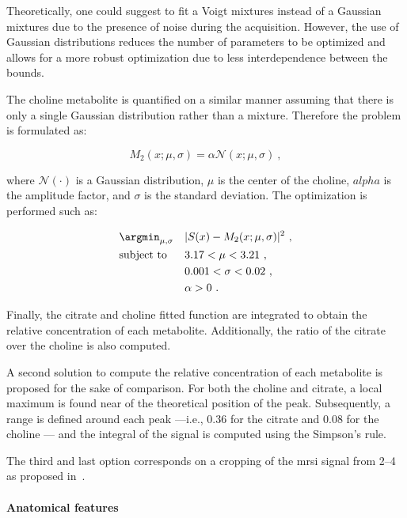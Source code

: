 Theoretically, one could suggest to fit a Voigt mixtures instead of a Gaussian mixtures due to the presence of noise during the acquisition.
However, the use of Gaussian distributions reduces the number of parameters to be optimized and allows for a more robust optimization due to less interdependence between the bounds.

The choline metabolite is quantified on a similar manner assuming that there is only a single Gaussian distribution rather than a mixture.
Therefore the problem is formulated as:

\begin{equation}
  M_2(x; \mu, \sigma) = \alpha \mathcal{N}(x; \mu, \sigma) \ ,
  \label{eq:costcho}
\end{equation}

\noindent where $\mathcal{N}(\cdot)$ is a Gaussian distribution, $\mu$ is the center of the choline, $alpha$ is the amplitude factor, and $\sigma$ is the standard deviation. The optimization is performed such as:

\begin{equation}
\begin{aligned}
& \argmin_{\mathbf{\mu, \sigma}} 
& & | S(x) - M_2(x; \mu, \sigma) |^{2} \ , \label{eq:mincostcho} \\
& \text{subject to}
& & 3.17 < \mu < 3.21 \ , \\
&&& 0.001 < \sigma < 0.02 \ , \\
&&& \alpha > 0 \ .
\end{aligned}
\end{equation}

Finally, the citrate and choline fitted function are integrated to obtain the relative concentration of each metabolite.
Additionally, the ratio of the citrate over the choline is also computed.

A second solution to compute the relative concentration of each metabolite is proposed for the sake of comparison.
For both the choline and citrate, a local maximum is found near of the theoretical position of the peak.
Subsequently, a range is defined around each peak ---i.e., \SI{0.36}{\ppm} for the citrate and \SI{0.08}{\ppm} for the choline --- and the integral of the signal is computed using the Simpson's rule.

The third and last option corresponds on a cropping of the \ac{mrsi} signal from \SIrange{2}{4}{\ppm} as proposed in~\cite{Parfait2012}.

\paragraph{Anatomical features}


